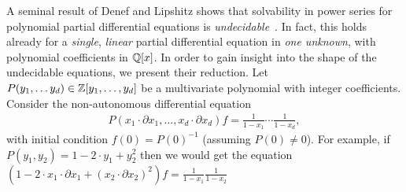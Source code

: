 \begin{remark}
    \label{rem:undecidability of solvability}
    A seminal result of Denef and Lipshitz shows that
    solvability in power series for polynomial partial differential equations is \emph{undecidable}~\cite[Theorem 4.11]{DenefLipshitz:1984}.
    In fact, this holds already for a \emph{single}, \emph{linear} partial differential equation in \emph{one unknown},
    with polynomial coefficients in $\mathbb Q[x]$.
    In order to gain insight into the shape of the undecidable equations,
    we present their reduction.
    Let $P(y_1, \dots y_d) \in \mathbb Z[y_1, \dots, y_d]$
    be a multivariate polynomial with integer coefficients.
    Consider the non-autonomous differential equation
    \begin{align}
        \label{eq:undecidable linear PDE}
        P(x_1 \cdot \partial {x_1} {}, \dots, x_d \cdot \partial {x_d} {}) f 
        = \frac 1 {1 - x_1} \cdots \frac 1 {1 - x_d},
    \end{align}
    with initial condition $f(0) = P(0)^{-1}$ (assuming $P(0) \neq 0$).
    For example, if $P(y_1, y_2) = 1 - 2 \cdot y_1 + y_2^2$
    then we would get the equation
    $(1 - 2 \cdot x_1 \cdot \partial {x_1} {} + (x_2 \cdot \partial {x_2} {})^2) f = \frac 1 {1 - x_1} \frac 1 {1 - x_2}$

\end{remark}
